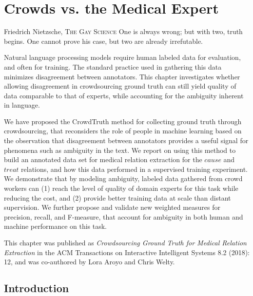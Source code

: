\chapter{Crowds vs. the Medical Expert}
\label{chap:med-rel-ex}

\begin{chapquote}{Friedrich Nietzsche, \textsc{The Gay Science}}
One is always wrong; but with two, truth begins. One cannot prove his case, but two are already irrefutable.
\end{chapquote}

Natural language processing models require human labeled data for evaluation, and often for training. The standard practice used in gathering this data minimizes disagreement between annotators. This chapter investigates whether allowing disagreement in crowdsourcing ground truth can still yield quality of data comparable to that of experts, while accounting for the ambiguity inherent in language.

We have proposed the CrowdTruth method for collecting ground truth through crowdsourcing, that reconsiders the role of people in machine learning based on the observation that disagreement between annotators provides a useful signal for phenomena such as ambiguity in the text. We report on using this method to build an annotated data set for medical relation extraction for the $cause$ and $treat$ relations, and how this data performed in a supervised training experiment. We demonstrate that by modeling ambiguity, labeled data gathered from crowd workers can (1) reach the level of quality of domain experts for this task while reducing the cost, and (2) provide better training data at scale than distant supervision. We further propose and validate new weighted measures for precision, recall, and F-measure, that account for ambiguity in both human and machine performance on this task.

This chapter was published as \textit{Crowdsourcing Ground Truth for Medical Relation Extraction} in the ACM Transactions on Interactive Intelligent Systems 8.2 (2018): 12, and was co-authored by Lora Aroyo and Chris Welty.~\cite{DBLP:journals/corr/DumitracheAW17}


\section{Introduction}

